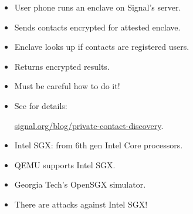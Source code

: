 \begin{frame}
  \begin{example}
    \begin{itemize}
      \item User phone runs an enclave on Signal's server.
      \item Sends contacts encrypted for attested enclave.
      \item Enclave looks up if contacts are registered users.
      \item Returns encrypted results.
    \end{itemize}
  \end{example}

  \pause

  \begin{remark}
    \begin{itemize}
      \item Must be careful how to do it!
      \item See \cite{SignalSGXContactDiscovery} for details:
        \begin{center}
          \href{https://signal.org/blog/private-contact-discovery/}
            {signal.org/blog/private-contact-discovery}.
        \end{center}
    \end{itemize}
  \end{remark}
\end{frame}

\begin{frame}
  \begin{example}[Implementations]
    \begin{itemize}
      \item Intel SGX: from 6th gen Intel Core processors.
      \item QEMU supports Intel SGX.
      \item Georgia Tech's OpenSGX simulator.
    \end{itemize}
  \end{example}
\end{frame}

\begin{frame}
  \begin{remark}
    \begin{itemize}
      \item There are attacks against Intel SGX!
    \end{itemize}
  \end{remark}
\end{frame}

